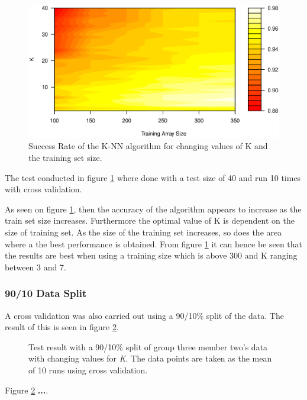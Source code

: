 \begin{figure}[H]
\centering
\includegraphics[width = 15cm]{graphics/graph_G3M2_50}
\caption{Success Rate of the K-NN algorithm for changing values of K and the training set size.}
\label{fig:personDependent_contour}
\end{figure}

The test conducted in figure \ref{fig:personDependent_contour} where done with a test size of 40 and run 10 times with cross validation.

As seen on figure \ref{fig:personDependent_contour}, then the accuracy of the algorithm appears to increase as the train set size increases.
Furthermore the optimal value of K is dependent on the size of training set. 
As the size of the training set increases, so does the area where a the best performance is obtained.
From figure \ref{fig:personDependent_contour} it can hence be seen that the results are best when using a training size which is above 300 and K ranging between 3 and 7.


\subsubsection{90/10 Data Split}
A cross validation was also carried out using a 90/10\% split of the data. 
The result of this is seen in figure \ref{fig:PersonDependent_9010}.


\begin{figure}[H]
\centering
\caption{Test result with a 90/10\% split of group three member two's data with changing values for \textit{K}. The data points are taken as the mean of 10 runs using cross validation.}
\label{fig:PersonDependent_9010}
\end{figure}

Figure \ref{fig:PersonDependent_9010} \textbf{...}.

